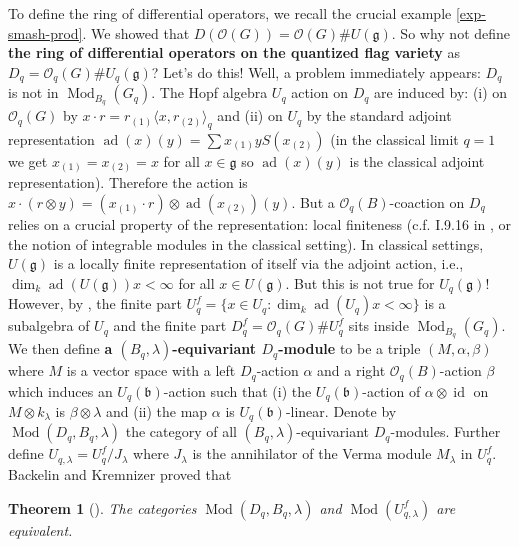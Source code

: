 \documentclass[11pt, a4paper]{article}
\newtheorem{theorem}{Theorem}[subsection]
\theoremstyle{definition}
\newcommand{\id}[0]{\operatorname{id}}
\newcommand{\ad}{\operatorname{ad}}
\newcommand{\Mod}{\operatorname{Mod}}
\renewcommand{\b}{\mathfrak b}
\newcommand{\g}{\mathfrak g}
\begin{document}
    To define the ring of differential operators, we recall the crucial example \cref{exp-smash-prod}. We showed that $D(\mathcal O(G))=\mathcal O(G)\# U(\g)$. So why not define \textbf{the ring of differential operators on the quantized flag variety} as $D_q=\mathcal O_q(G)\# U_q(\g)$? Let's do this! Well, a problem immediately appears: $D_q$ is not in $\Mod_{B_q}(G_q)$. The Hopf algebra $U_q$ action on $D_q$ are induced by: (i) on $\mathcal O_q(G)$ by $x\cdot r=r_{(1)}\langle x,r_{(2)}\rangle_q$ and (ii) on $U_q$ by the standard adjoint representation $\ad(x)(y)=\sum x_{(1)}yS(x_{(2)})$ (in the classical limit $q=1$ we get $x_{(1)}=x_{(2)}=x$ for all $x\in\g$ so $\ad(x)(y)$ is the classical adjoint representation). Therefore the action is $x\cdot (r\otimes y)=(x_{(1)}\cdot r)\otimes \ad(x_{(2)})(y)$. But a $\mathcal O_q(B)$-coaction on $D_q$ relies on a crucial property of the representation: local finiteness (c.f. I.9.16 in \cite{MR1898492}, or the notion of integrable modules in the classical setting). In classical settings, $U(\g)$ is a locally finite representation of itself via the adjoint action, i.e., $\dim_k \ad(U(\g))x<\infty$ for all $x\in U(\g)$. But this is not true for $U_q(\g)$! However, by \cite{MR1198203}, the finite part $U^{f}_q=\{x\in U_q:\dim_k \ad(U_q)x<\infty\}$ is a subalgebra of $U_q$ and the finite part $D_q^f=\mathcal O_q(G)\# U^f_q$ sits inside $\Mod_{B_q}(G_q)$. We then define \textbf{a $(B_q, \lambda)$-equivariant $D_q$-module} to be a triple $(M,\alpha,\beta)$ where $M$ is a vector space with a left $D_q$-action $\alpha$ and a right $\mathcal O_q(B)$-action $\beta$ which induces an $U_q(\b)$-action such that (i) the $U_q(\b)$-action of $\alpha\otimes\id$ on $M\otimes k_\lambda$ is $\beta\otimes\lambda$ and (ii) the map $\alpha$ is $U_q(\b)$-linear. Denote by $\Mod(D_q,B_q,\lambda)$ the category of all $(B_q, \lambda)$-equivariant $D_q$-modules. Further define $U_{q, \lambda}=U^f_q/J_\lambda$ where $J_\lambda$ is the annihilator of the Verma module $M_\lambda$ in $U_q^f$. Backelin and Kremnizer proved that
    \begin{theorem}[\cite{backelin-quantum}]
        The categories $\Mod(D_q,B_q,\lambda)$ and $\Mod(U^f_{q, \lambda})$ are equivalent.
    \end{theorem}
\end{document}
